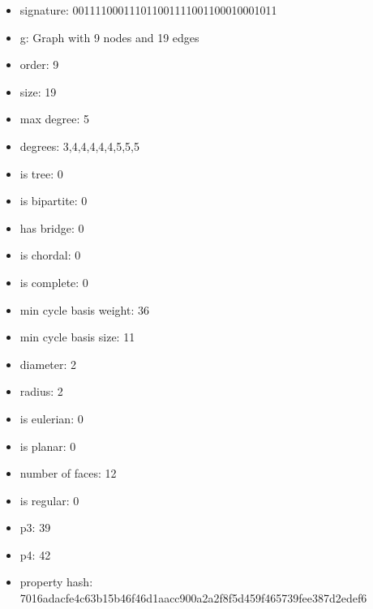 \newpage
\begin{figure}
\end{figure}
\begin{itemize}
\item signature: 001111000111011001111001100010001011
\item g: Graph with 9 nodes and 19 edges
\item order: 9
\item size: 19
\item max degree: 5
\item degrees: 3,4,4,4,4,4,5,5,5
\item is tree: 0
\item is bipartite: 0
\item has bridge: 0
\item is chordal: 0
\item is complete: 0
\item min cycle basis weight: 36
\item min cycle basis size: 11
\item diameter: 2
\item radius: 2
\item is eulerian: 0
\item is planar: 0
\item number of faces: 12
\item is regular: 0
\item p3: 39
\item p4: 42
\item property hash: 7016adacfe4c63b15b46f46d1aacc900a2a2f8f5d459f465739fee387d2edef6
\end{itemize}
